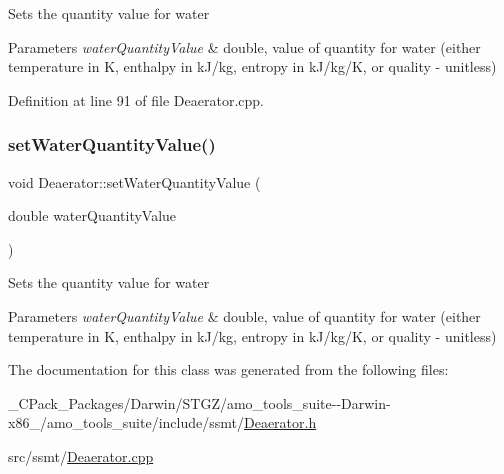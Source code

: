 Sets the quantity value for water 
\begin{DoxyParams}{Parameters}
{\em water\+Quantity\+Value} & double, value of quantity for water (either temperature in K, enthalpy in k\+J/kg, entropy in k\+J/kg/K, or quality -\/ unitless) \\
\hline
\end{DoxyParams}


Definition at line 91 of file Deaerator.\+cpp.

\mbox{\label{class_deaerator_ac31cf2deb8bf30ee6921d1d9f8281eb8}} 
\subsubsection{\texorpdfstring{set\+Water\+Quantity\+Value()}{setWaterQuantityValue()}\hspace{0.1cm}{\footnotesize\ttfamily [3/3]}}
{\footnotesize\ttfamily void Deaerator\+::set\+Water\+Quantity\+Value (\begin{DoxyParamCaption}\item[{double}]{water\+Quantity\+Value }\end{DoxyParamCaption})}

Sets the quantity value for water 
\begin{DoxyParams}{Parameters}
{\em water\+Quantity\+Value} & double, value of quantity for water (either temperature in K, enthalpy in k\+J/kg, entropy in k\+J/kg/K, or quality -\/ unitless) \\
\hline
\end{DoxyParams}


The documentation for this class was generated from the following files\+:\begin{DoxyCompactItemize}
\item 
\+\_\+\+C\+Pack\+\_\+\+Packages/\+Darwin/\+S\+T\+G\+Z/amo\+\_\+tools\+\_\+suite-\/-\/\+Darwin-\/x86\+\_/amo\+\_\+tools\+\_\+suite/include/ssmt/\hyperlink{___c_pack___packages_2_darwin_2_s_t_g_z_2amo__tools__suite--_darwin-x86__64_2amo__tools__suite_2include_2ssmt_2_deaerator_8h}{Deaerator.\+h}\item 
src/ssmt/\hyperlink{_deaerator_8cpp}{Deaerator.\+cpp}\end{DoxyCompactItemize}
